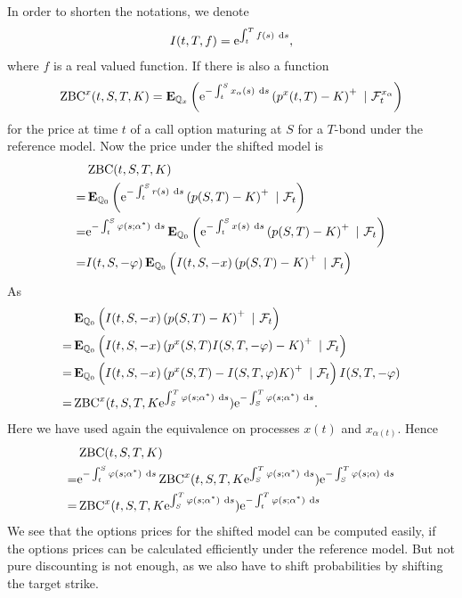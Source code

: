 In order to shorten the notations, we denote
	\begin{align}
		I(t,T,f) = \mathrm{e}^{ \int_t^T f(s) \ \mathrm{d} s } ,
	\end{align}
where $f$ is a real valued function. If there is also a function
\begin{align}
\operatorname{\mathrm{ZBC}}^x (t,S,T,K) = \operatorname{\boldsymbol{\mathrm{E}}}_{\mathbb{Q}_x} \left( \mathrm{e}^{ - \int_t^S x_{\alpha}(s) \ \mathrm{d} s} \left( p^x(t,T) - K \right)^+ \ | \ \mathcal{F}_t^{x_{\alpha}} \right) 
\end{align}
for the price at time $t$ of a call option maturing at $S$ for a $T$-bond under the reference model. Now the price under the shifted model is
	\begin{align}
	&\operatorname{\mathrm{ZBC}}(t,S,T,K) \\ = &\operatorname{\boldsymbol{\mathrm{E}}}_{\mathbb{Q}_0} \left( \mathrm{e}^{ - \int_t^S r(s) \ \mathrm{d} s} \left( p(S,T) - K \right)^+ \ | \ \mathcal{F}_t \right) \\
		= &\mathrm{e}^{ - \int_t^S \varphi(s; \alpha^*) \ \mathrm{d} s} \operatorname{\boldsymbol{\mathrm{E}}}_{\mathbb{Q}_0} \left( \mathrm{e}^{ - \int_t^S x(s) \ \mathrm{d} s} \left( p(S,T) - K \right)^+ \ | \ \mathcal{F}_t \right) \\
		= &I(t,S, -\varphi) \operatorname{\boldsymbol{\mathrm{E}}}_{\mathbb{Q}_0} \left( I(t,S,-x) \left( p(S,T) - K \right)^+ \ | \ \mathcal{F}_t \right)
	\end{align}
As
	\begin{align}
		&\operatorname{\boldsymbol{\mathrm{E}}}_{\mathbb{Q}_0} \left( I(t,S,-x) \left( p(S,T) - K \right)^+ \ | \ \mathcal{F}_t \right) \\
		= &\operatorname{\boldsymbol{\mathrm{E}}}_{\mathbb{Q}_0} \left( I(t,S,-x) \left( p^x(S,T) I(S,T,-\varphi) - K \right)^+ \ | \ \mathcal{F}_t \right) \\
		= &\operatorname{\boldsymbol{\mathrm{E}}}_{\mathbb{Q}_0} \left( I(t,S,-x) \left( p^x(S,T) - I(S,T,\varphi) K \right)^+ \ | \ \mathcal{F}_t \right) I(S,T,-\varphi) \\
		= &\operatorname{\mathrm{ZBC}}^x(t,S,T,K\mathrm{e}^{ \int_S^T \varphi(s; \alpha^*) \ \mathrm{d} s}) \mathrm{e}^{ - \int_S^T \varphi(s; \alpha^*) \ \mathrm{d} s} .
	\end{align}
Here we have used again the equivalence on processes $x(t)$ and $x_{\alpha(t)}$. Hence
	\begin{align}
		&\ZBC(t,S,T,K) \\ = &\e^{ - \int_t^S \varphi(s; \alpha^*) \ \dx s} \ZBC^x(t,S,T,K\e^{ \int_S^T \varphi(s; \alpha^*) \ \dx s}) \e^{ - \int_S^T \varphi(s; \alpha) \ \dx s} \\
		= & \ZBC^x(t,S,T,K\e^{ \int_S^T \varphi(s; \alpha^*) \ \dx s}) \e^{ - \int_t^T \varphi(s; \alpha^*) \ \dx s}
	\end{align}
We see that the options prices for the shifted model can be computed easily, if the options prices can be calculated efficiently under the reference model. But not pure discounting is not enough, as we also have to shift probabilities by shifting the target strike.  

